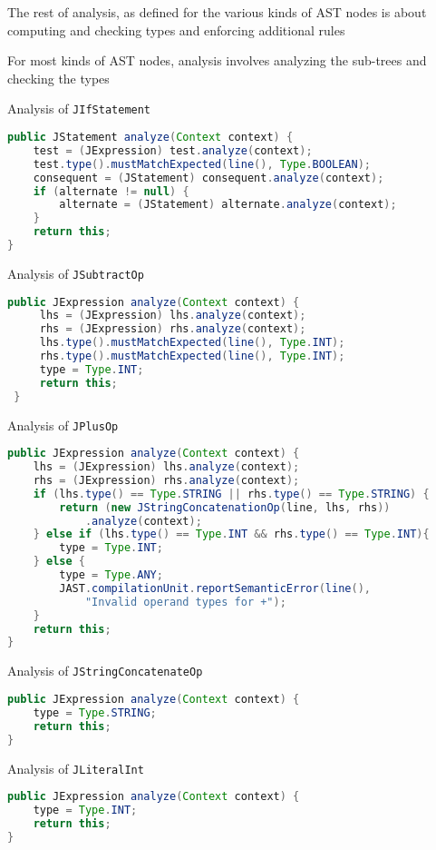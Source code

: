 \documentclass[8pt,a4paper,compress]{beamer}
\begin{document}
\begin{frame}[fragile]
\pause

The rest of analysis, as defined for the various kinds of AST nodes is about computing and checking types and enforcing additional \jmm rules

\pause
\bigskip

For most kinds of AST nodes, analysis involves analyzing the sub-trees and checking the types

\pause
\bigskip

Analysis of \lstinline{JIfStatement}
\begin{lstlisting}[language=Java,style=focusin]
public JStatement analyze(Context context) {
    test = (JExpression) test.analyze(context);
    test.type().mustMatchExpected(line(), Type.BOOLEAN);
    consequent = (JStatement) consequent.analyze(context);
    if (alternate != null) {
        alternate = (JStatement) alternate.analyze(context);
    }
    return this;
}
\end{lstlisting}

\pause
\bigskip

Analysis of \lstinline{JSubtractOp}
\begin{lstlisting}[language=Java,style=focusin]
public JExpression analyze(Context context) {
     lhs = (JExpression) lhs.analyze(context);
     rhs = (JExpression) rhs.analyze(context);
     lhs.type().mustMatchExpected(line(), Type.INT);
     rhs.type().mustMatchExpected(line(), Type.INT);
     type = Type.INT;
     return this;
 }
\end{lstlisting}
\end{frame}

\begin{frame}[fragile]
\pause

Analysis of \lstinline{JPlusOp}
\begin{lstlisting}[language=Java,style=focusin]
public JExpression analyze(Context context) {
    lhs = (JExpression) lhs.analyze(context);
    rhs = (JExpression) rhs.analyze(context);
    if (lhs.type() == Type.STRING || rhs.type() == Type.STRING) {
        return (new JStringConcatenationOp(line, lhs, rhs))
            .analyze(context);
    } else if (lhs.type() == Type.INT && rhs.type() == Type.INT){
        type = Type.INT;
    } else {
        type = Type.ANY;
        JAST.compilationUnit.reportSemanticError(line(),
            "Invalid operand types for +");
    }
    return this;
}
\end{lstlisting}

\pause
\bigskip

Analysis of \lstinline{JStringConcatenateOp}
\begin{lstlisting}[language=Java,style=focusin]
public JExpression analyze(Context context) {
    type = Type.STRING;
    return this;
}
\end{lstlisting}

\pause
\bigskip

Analysis of \lstinline{JLiteralInt}
\begin{lstlisting}[language=Java,style=focusin]
public JExpression analyze(Context context) {
    type = Type.INT;
    return this;
}
\end{lstlisting}
\end{frame}
\end{document}
